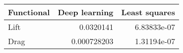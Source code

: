 \begin{tabular}{lrr}
\toprule
 Functional   &   Deep learning &   Least squares \\
\midrule
 Lift         &     0.0320141   &     6.83833e-07 \\
 Drag         &     0.000728203 &     1.31194e-07 \\
\bottomrule
\end{tabular}
